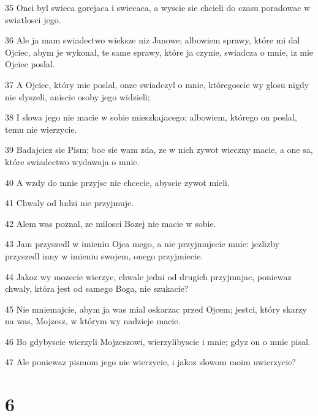 \par 35 Onci byl swieca gorejaca i swiecaca, a wyscie sie chcieli do czasu poradowac w swiatlosci jego.
\par 36 Ale ja mam swiadectwo wieksze niz Janowe; albowiem sprawy, które mi dal Ojciec, abym je wykonal, te same sprawy, które ja czynie, swiadcza o mnie, iz mie Ojciec poslal.
\par 37 A Ojciec, który mie poslal, onze swiadczyl o mnie, któregoscie wy glosu nigdy nie slyszeli, aniscie osoby jego widzieli;
\par 38 I slowa jego nie macie w sobie mieszkajacego; albowiem, którego on poslal, temu nie wierzycie.
\par 39 Badajciez sie Pism; boc sie wam zda, ze w nich zywot wieczny macie, a one sa, które swiadectwo wydawaja o mnie.
\par 40 A wzdy do mnie przyjsc nie chcecie, abyscie zywot mieli.
\par 41 Chwaly od ludzi nie przyjmuje.
\par 42 Alem was poznal, ze milosci Bozej nie macie w sobie.
\par 43 Jam przyszedl w imieniu Ojca mego, a nie przyjmujecie mnie: jezlizby przyszedl inny w imieniu swojem, onego przyjmiecie.
\par 44 Jakoz wy mozecie wierzyc, chwale jedni od drugich przyjmujac, poniewaz chwaly, która jest od samego Boga, nie szukacie?
\par 45 Nie mniemajcie, abym ja was mial oskarzac przed Ojcem; jestci, który skarzy na was, Mojzesz, w którym wy nadzieje macie.
\par 46 Bo gdybyscie wierzyli Mojzeszowi, wierzylibyscie i mnie; gdyz on o mnie pisal.
\par 47 Ale poniewaz pismom jego nie wierzycie, i jakoz slowom moim uwierzycie?

\chapter{6}

